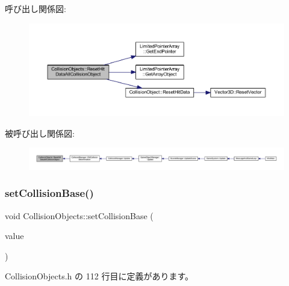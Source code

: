 呼び出し関係図\+:\nopagebreak
\begin{figure}[H]
\begin{center}
\leavevmode
\includegraphics[width=350pt]{class_collision_objects_a01ffe9567540a819f19cd66f96981b47_cgraph}
\end{center}
\end{figure}
被呼び出し関係図\+:
\nopagebreak
\begin{figure}[H]
\begin{center}
\leavevmode
\includegraphics[width=350pt]{class_collision_objects_a01ffe9567540a819f19cd66f96981b47_icgraph}
\end{center}
\end{figure}
\mbox{\label{class_collision_objects_a144f0c9160c0dda1579c26a0726fdbb6}} 
\subsubsection{\texorpdfstring{set\+Collision\+Base()}{setCollisionBase()}}
{\footnotesize\ttfamily void Collision\+Objects\+::set\+Collision\+Base (\begin{DoxyParamCaption}\item[{\mbox{\hyperlink{class_collision_base}{Collision\+Base}} $\ast$}]{value }\end{DoxyParamCaption})\hspace{0.3cm}{\ttfamily [inline]}}



 Collision\+Objects.\+h の 112 行目に定義があります。

